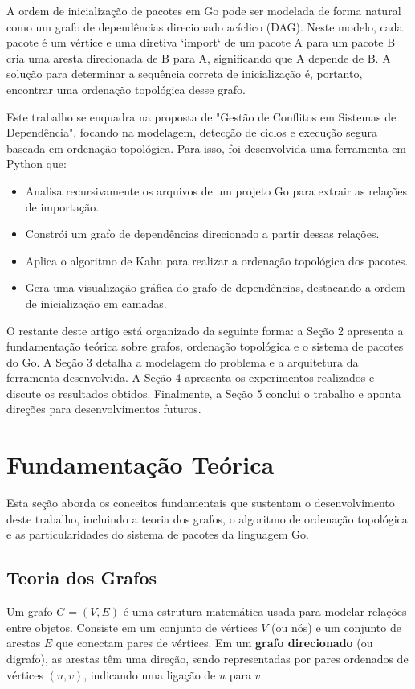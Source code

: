 \documentclass[12pt]{article}
\begin{document}
A ordem de inicialização de pacotes em Go pode ser modelada de forma natural como um grafo de dependências direcionado acíclico (DAG). Neste modelo, cada pacote é um vértice e uma diretiva `import` de um pacote A para um pacote B cria uma aresta direcionada de B para A, significando que A depende de B. A solução para determinar a sequência correta de inicialização é, portanto, encontrar uma ordenação topológica desse grafo.

Este trabalho se enquadra na proposta de "Gestão de Conflitos em Sistemas de Dependência", focando na modelagem, detecção de ciclos e execução segura baseada em ordenação topológica. Para isso, foi desenvolvida uma ferramenta em Python que:
\begin{itemize}
    \item Analisa recursivamente os arquivos de um projeto Go para extrair as relações de importação.
    \item Constrói um grafo de dependências direcionado a partir dessas relações.
    \item Aplica o algoritmo de Kahn para realizar a ordenação topológica dos pacotes.
    \item Gera uma visualização gráfica do grafo de dependências, destacando a ordem de inicialização em camadas.
\end{itemize}

O restante deste artigo está organizado da seguinte forma: a Seção 2 apresenta a fundamentação teórica sobre grafos, ordenação topológica e o sistema de pacotes do Go. A Seção 3 detalha a modelagem do problema e a arquitetura da ferramenta desenvolvida. A Seção 4 apresenta os experimentos realizados e discute os resultados obtidos. Finalmente, a Seção 5 conclui o trabalho e aponta direções para desenvolvimentos futuros.

\section{Fundamentação Teórica}
Esta seção aborda os conceitos fundamentais que sustentam o desenvolvimento deste trabalho, incluindo a teoria dos grafos, o algoritmo de ordenação topológica e as particularidades do sistema de pacotes da linguagem Go.

\subsection{Teoria dos Grafos}
Um grafo $G = (V, E)$ é uma estrutura matemática usada para modelar relações entre objetos. Consiste em um conjunto de vértices $V$ (ou nós) e um conjunto de arestas $E$ que conectam pares de vértices. Em um \textbf{grafo direcionado} (ou digrafo), as arestas têm uma direção, sendo representadas por pares ordenados de vértices $(u, v)$, indicando uma ligação de $u$ para $v$.
\end{document}
